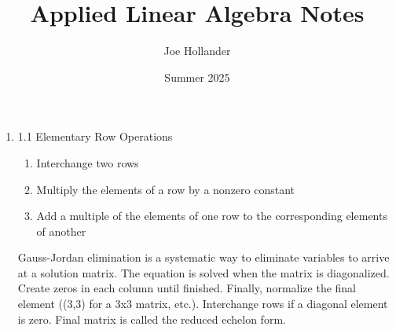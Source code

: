 \documentclass{article}
\title{Applied Linear Algebra Notes}
\author{Joe Hollander}
\date{Summer 2025}
\begin{document}
\maketitle 

\begin{enumerate}
    \item 1.1
    Elementary Row Operations
    \begin{enumerate}
        \item Interchange two rows
        \item Multiply the elements of a row by a nonzero constant
        \item Add a multiple of the elements of one row to the corresponding elements of another
    \end{enumerate}
    Gauss-Jordan elimination is a systematic way to eliminate variables to arrive at a solution matrix. 
    The equation is solved when the matrix is diagonalized. Create zeros in each column until finished. 
    Finally, normalize the final element ((3,3) for a 3x3 matrix, etc.). 
    Interchange rows if a diagonal element is zero. Final matrix is called the reduced echelon form.
\end{enumerate}
\end{document}
